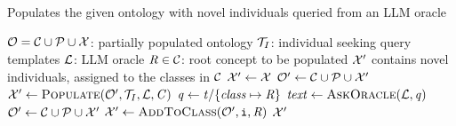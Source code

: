 \begin{algorithm}
    \captionsetup{font=\algCaptionSize}
    \caption{Populates the given ontology with novel individuals queried from an LLM oracle}
    \label{alg:populate}
    \begin{algorithmic}[1]\algCodeSize
        \Require $\relset{O} = \relset{C} \cup \relset{P} \cup \relset{X}$: partially populated ontology
        \Require $\relset{T}_{I}$: individual seeking query templates
        \Require $\relset{L}$: LLM oracle
        \Require $\concept{R} \in \relset{C}$: root concept to be populated
        \Ensure $\relset{X}'$ contains novel individuals, assigned to the classes in $\relset{C}$
        \medskip
            \State $\relset{X}' \gets \relset{X}$
                \State $\relset{O}' \gets \relset{C} \cup \relset{P} \cup \relset{X}'$
                \State $\relset{X}' \gets \Call{\populate}{\relset{O}', \relset{T}_{I}, \relset{L}, \concept{C}}$
            \EndFor
                \State $\mathit{q} \gets \mathit{t}/\{ \var{class} \mapsto \concept{R} \}$
                \State $\mathit{text} \gets \Call{\askOracle}{\relset{L}, \mathit{q}}$
                    \State $\relset{O}' \gets \relset{C} \cup \relset{P} \cup \relset{X}'$
                    \State $\relset{X}' \gets \Call{\addToClass}{\relset{O}', \instance{i}, \concept{R}}$
                \EndFor
            \EndFor
            \State \Return $\relset{X}'$
        \EndFunction
    \end{algorithmic}
\end{algorithm}